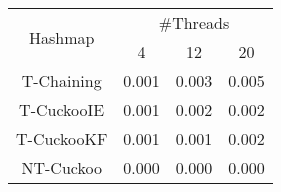 \begin{tabular}{|c|c|c|c|}
\hline
\multirow{2}{*}{Hashmap} & \multicolumn{3}{c|}{\#Threads}\\\cline{2-4}& 4 & 12 & 20\\
\hline
\hline
T-Chaining & 0.001 & 0.003 & 0.005\\
T-CuckooIE & 0.001 & 0.002 & 0.002\\
T-CuckooKF & 0.001 & 0.001 & 0.002\\
NT-Cuckoo & 0.000 & 0.000 & 0.000\\
\hline
\end{tabular}
